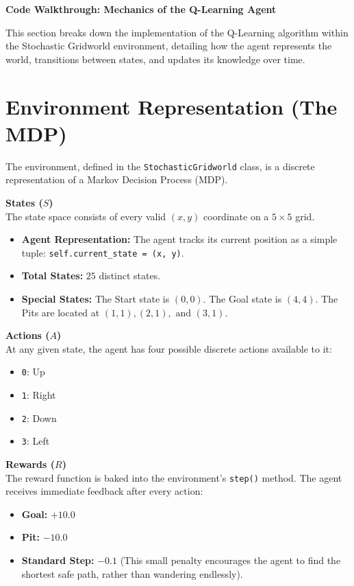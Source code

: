 \begin{center}
    \Large\textbf{\textcolor{primary}{Code Walkthrough: Mechanics of the Q-Learning Agent}}
\end{center}
\vspace{0.5cm}

This section breaks down the implementation of the Q-Learning algorithm within the Stochastic Gridworld environment, detailing how the agent represents the world, transitions between states, and updates its knowledge over time.

\section{\textcolor{secondary}{Environment Representation (The MDP)}}
The environment, defined in the \texttt{StochasticGridworld} class, is a discrete representation of a Markov Decision Process (MDP).

\textbf{\textcolor{primary}{States ($S$)}} \\
The state space consists of every valid $(x, y)$ coordinate on a $5 \times 5$ grid.
\begin{itemize}
    \item \textbf{Agent Representation:} The agent tracks its current position as a simple tuple: \texttt{self.current\_state = (x, y)}.
    \item \textbf{Total States:} $25$ distinct states.
    \item \textbf{Special States:} The Start state is $(0,0)$. The Goal state is $(4,4)$. The Pits are located at $(1,1), (2,1), \text{ and } (3,1)$.
\end{itemize}

\textbf{\textcolor{primary}{Actions ($A$)}} \\
At any given state, the agent has four possible discrete actions available to it:
\begin{itemize}
    \item \texttt{0}: Up
    \item \texttt{1}: Right
    \item \texttt{2}: Down
    \item \texttt{3}: Left
\end{itemize}

\textbf{\textcolor{primary}{Rewards ($R$)}} \\
The reward function is baked into the environment's \texttt{step()} method. The agent receives immediate feedback after every action:
\begin{itemize}
    \item \textbf{Goal:} $+10.0$
    \item \textbf{Pit:} $-10.0$
    \item \textbf{Standard Step:} $-0.1$ (This small penalty encourages the agent to find the shortest safe path, rather than wandering endlessly).
\end{itemize}


